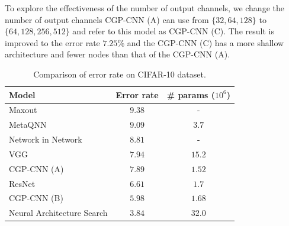 To explore the effectiveness of the number of output channels, we change the number of output channels CGP-CNN (A) can use from $\{32, 64, 128\}$ to $\{64, 128, 256, 512\}$ and refer to this model as CGP-CNN (C).
The result is improved to the error rate $7.25$\% and the CGP-CNN (C) has a more shallow architecture and fewer nodes than that of the CGP-CNN (A).




\begin{table}[t]
  \caption{Comparison of error rate on CIFAR-10 dataset.}
  \label{results}
  \begin{tabular}{l|c|c} \hline
    Model & Error rate & \# params ($10^6$) \\ \hline
   Maxout \cite{goodfellow_maxout_2013} & $9.38$ & - \\ 
   MetaQNN \cite{baker_designing_2016} \footnotemark & $9.09$ & $3.7$ \\
   Network in Network \cite{lin_network_2013} & $8.81$ & - \\
   VGG \cite{simonyan_very_2014} \footnotemark & $7.94$ & $15.2$ \\
   CGP-CNN (A) & $7.89$ & $1.52$ \\
   ResNet \cite{he_deep_2016} & $6.61$ & $1.7$ \\
   CGP-CNN (B) & $5.98$ & $1.68$ \\
   Neural Architecture Search \cite{zoph_neural_2016} & $3.84$ & $32.0$ \\ \hline
  \end{tabular}
\end{table}



